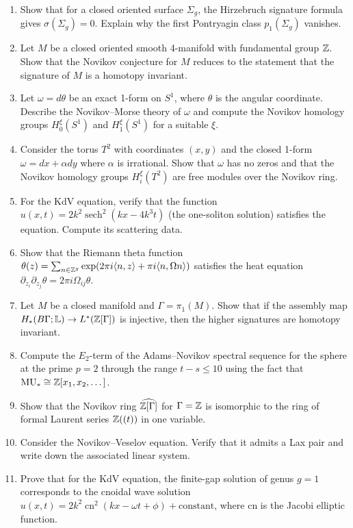\begin{enumerate}
    \item [B] Show that for a closed oriented surface \(\Sigma_g\), the Hirzebruch signature formula gives \(\sigma(\Sigma_g) = 0\). Explain why the first Pontryagin class \(p_1(\Sigma_g)\) vanishes.
    \item [I] Let \(M\) be a closed oriented smooth 4-manifold with fundamental group \(\mathbb{Z}\). Show that the Novikov conjecture for \(M\) reduces to the statement that the signature of \(M\) is a homotopy invariant.
    \item [I] Let \(\omega = d\theta\) be an exact 1-form on \(S^1\), where \(\theta\) is the angular coordinate. Describe the Novikov--Morse theory of \(\omega\) and compute the Novikov homology groups \(H_0^\xi(S^1)\) and \(H_1^\xi(S^1)\) for a suitable \(\xi\).
    \item [I] Consider the torus \(T^2\) with coordinates \((x,y)\) and the closed 1-form \(\omega = dx + \alpha dy\) where \(\alpha\) is irrational. Show that \(\omega\) has no zeros and that the Novikov homology groups \(H_i^\xi(T^2)\) are free modules over the Novikov ring.
    \item [B] For the KdV equation, verify that the function \(u(x,t) = 2k^2 \operatorname{sech}^2(kx - 4k^3 t)\) (the one-soliton solution) satisfies the equation. Compute its scattering data.
    \item [I] Show that the Riemann theta function \(\theta(z) = \sum_{n \in \mathbb{Z}^g} \exp(2\pi i \langle n, z \rangle + \pi i \langle n, \Omega n \rangle)\) satisfies the heat equation \(\partial_{z_i} \partial_{z_j} \theta = 2\pi i \Omega_{ij} \theta\).
    \item [A] Let \(M\) be a closed manifold and \(\Gamma = \pi_1(M)\). Show that if the assembly map \(H_*(B\Gamma; \mathbb{L}) \to L^*(\mathbb{Z}[\Gamma])\) is injective, then the higher signatures are homotopy invariant.
    \item [I] Compute the \(E_2\)-term of the Adams--Novikov spectral sequence for the sphere at the prime \(p=2\) through the range \(t-s \leq 10\) using the fact that \(\operatorname{MU}_* \cong \mathbb{Z}[x_1, x_2, \dots]\).
    \item [B] Show that the Novikov ring \(\widehat{\mathbb{Z}[\Gamma]}\) for \(\Gamma = \mathbb{Z}\) is isomorphic to the ring of formal Laurent series \(\mathbb{Z}((t))\) in one variable.
    \item [I] Consider the Novikov--Veselov equation. Verify that it admits a Lax pair and write down the associated linear system.
    \item [I] Prove that for the KdV equation, the finite-gap solution of genus \(g=1\) corresponds to the cnoidal wave solution \(u(x,t) = 2k^2 \operatorname{cn}^2(kx - \omega t + \phi) + \text{constant}\), where cn is the Jacobi elliptic function.

\end{enumerate}
